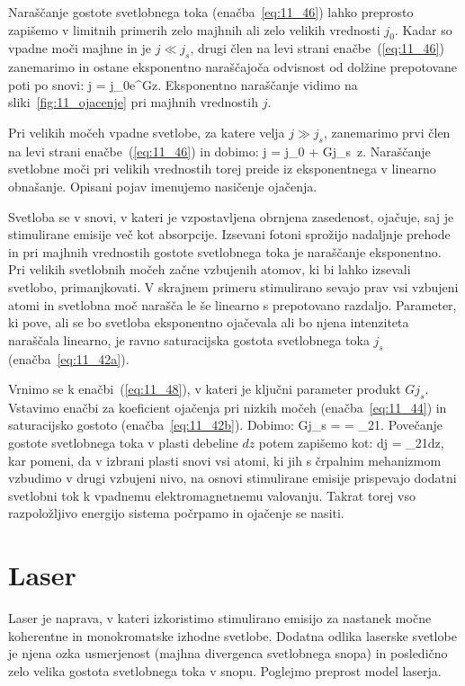 Naraščanje gostote svetlobnega toka (enačba~\ref{eq:11_46}) 
lahko preprosto zapišemo v limitnih primerih zelo majhnih ali 
zelo velikih vrednosti $j_0$. 
Kadar so vpadne moči majhne in je $j \ll j_s$, drugi člen
na levi strani enačbe~(\ref{eq:11_46}) zanemarimo in ostane eksponentno 
naraščajoča odvisnost od dolžine prepotovane poti po snovi:
\beq
j = j_0e^{Gz}.
\label{eq:11_47}
\eeq
Eksponentno naraščanje vidimo na sliki~\ref{fig:11_ojacenje}
pri majhnih vrednostih $j$. 

Pri velikih močeh vpadne svetlobe, za katere velja $j \gg j_s$, 
zanemarimo prvi člen na levi strani enačbe~(\ref{eq:11_46}) in dobimo:
\beq
j = j_0 + Gj_s\, z.
\label{eq:11_48}
\eeq
Naraščanje svetlobne moči pri velikih vrednostih torej preide iz 
eksponentnega v linearno obnašanje. Opisani pojav imenujemo 
nasičenje ojačenja.

Svetloba se v snovi, v kateri je vzpostavljena
obrnjena zasedenost, ojačuje, saj je stimulirane emisije več
kot absorpcije. Izsevani fotoni sprožijo nadaljnje prehode
in pri majhnih vrednostih gostote svetlobnega toka je  
naraščanje eksponentno. Pri velikih svetlobnih močeh začne
vzbujenih atomov, ki bi lahko izsevali svetlobo, primanjkovati.
V skrajnem primeru stimulirano sevajo prav vsi vzbujeni atomi in 
svetlobna moč narašča le še linearno s prepotovano razdaljo. 
Parameter, ki pove, 
ali se bo svetloba eksponentno ojačevala ali bo njena
intenziteta naraščala  linearno, je ravno saturacijska
gostota svetlobnega toka $j_s$ (enačba~\ref{eq:11_42a}). 

Vrnimo se k enačbi~(\ref{eq:11_48}), v kateri je 
ključni parameter produkt $Gj_s$. Vstavimo enačbi
za koeficient ojačenja pri nizkih močeh (enačba~\ref{eq:11_44}) 
in saturacijsko gostoto (enačba~\ref{eq:11_42b}). Dobimo:
\beq
Gj_s = \sigma {} 
\cdot {}=
\hslash \omega_{21}.
\label{eq:11_49}
\eeq
Povečanje gostote svetlobnega toka v plasti debeline $dz$ potem zapišemo kot:
\beq
dj = \hslash \omega_{21}dz,
\label{eq:11_50}
\eeq
kar pomeni, da v izbrani plasti snovi vsi atomi, 
ki jih s črpalnim mehanizmom vzbudimo v drugi vzbujeni
nivo, na osnovi stimulirane emisije prispevajo dodatni 
svetlobni tok k vpadnemu elektromagnetnemu valovanju.
Takrat torej vso razpoložljivo energijo sistema počrpamo 
in ojačenje se nasiti. 

\section{Laser}
Laser je naprava, v kateri izkoristimo stimulirano emisijo 
za nastanek močne koherentne in monokromatske izhodne svetlobe. Dodatna odlika
laserske svetlobe je njena ozka usmerjenost (majhna divergenca svetlobnega snopa)
in posledično zelo velika gostota svetlobnega toka v snopu. Poglejmo preprost
model laserja.

